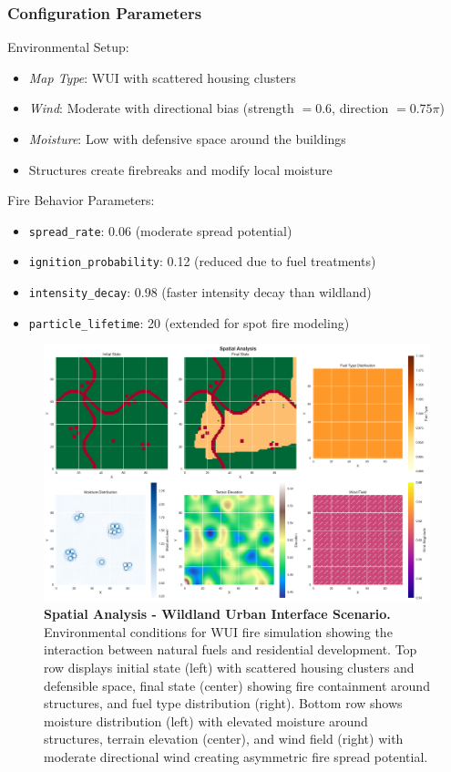 \subsubsection{Configuration Parameters}
Environmental Setup:
\begin{itemize}
	\item \textit{Map Type}: WUI with scattered housing clusters
	\item \textit{Wind}: Moderate with directional bias (strength $=0.6$, direction $=0.75 \pi$)
	\item \textit{Moisture}: Low with defensive space around the buildings
	\item Structures create firebreaks and modify local moisture
\end{itemize}
Fire Behavior Parameters:
\begin{itemize}
	\item \texttt{spread\_rate}: 0.06 (moderate spread potential)
	\item \texttt{ignition\_probability}: 0.12 (reduced due to fuel treatments)
	\item \texttt{intensity\_decay}: 0.98 (faster intensity decay than wildland)
	\item \texttt{particle\_lifetime}: 20 (extended for spot fire modeling)
\end{itemize}
\begin{figure}[H]
	\centering
	\includegraphics[width=\textwidth]{media/spatial_analysis_wui.png}
	\caption{
		\textbf{Spatial Analysis - Wildland Urban Interface Scenario.}
		Environmental conditions for WUI fire simulation showing the interaction between natural fuels and residential development. Top row displays initial state (left) with scattered housing clusters and defensible space, final state (center) showing fire containment around structures, and fuel type distribution (right). Bottom row shows moisture distribution (left) with elevated moisture around structures, terrain elevation (center), and wind field (right) with moderate directional wind creating asymmetric fire spread potential.
	}
	\label{fig:spatial_wui}
\end{figure}

